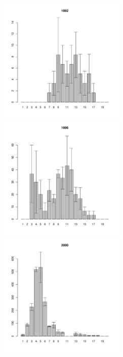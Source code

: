 
\begin{figure}[h]

\begin{multicols}{3}
\hfill
\includegraphics[width=60mm]{../White_Sea/Estuatiy_Luvenga/sizestr_1992_.pdf}
\hfill
\includegraphics[width=60mm]{../White_Sea/Estuatiy_Luvenga/sizestr_1996_.pdf}
\hfill
\includegraphics[width=60mm]{../White_Sea/Estuatiy_Luvenga/sizestr_2000_.pdf}
\end{multicols}




\end{figure}
